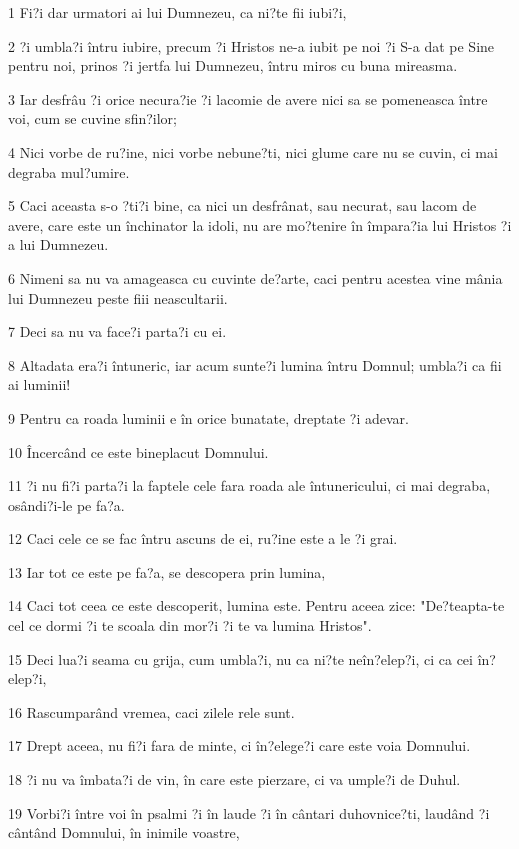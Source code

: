 \par 1 Fi?i dar urmatori ai lui Dumnezeu, ca ni?te fii iubi?i,
\par 2 ?i umbla?i întru iubire, precum ?i Hristos ne-a iubit pe noi ?i S-a dat pe Sine pentru noi, prinos ?i jertfa lui Dumnezeu, întru miros cu buna mireasma.
\par 3 Iar desfrâu ?i orice necura?ie ?i lacomie de avere nici sa se pomeneasca între voi, cum se cuvine sfin?ilor;
\par 4 Nici vorbe de ru?ine, nici vorbe nebune?ti, nici glume care nu se cuvin, ci mai degraba mul?umire.
\par 5 Caci aceasta s-o ?ti?i bine, ca nici un desfrânat, sau necurat, sau lacom de avere, care este un închinator la idoli, nu are mo?tenire în împara?ia lui Hristos ?i a lui Dumnezeu.
\par 6 Nimeni sa nu va amageasca cu cuvinte de?arte, caci pentru acestea vine mânia lui Dumnezeu peste fiii neascultarii.
\par 7 Deci sa nu va face?i parta?i cu ei.
\par 8 Altadata era?i întuneric, iar acum sunte?i lumina întru Domnul; umbla?i ca fii ai luminii!
\par 9 Pentru ca roada luminii e în orice bunatate, dreptate ?i adevar.
\par 10 Încercând ce este bineplacut Domnului.
\par 11 ?i nu fi?i parta?i la faptele cele fara roada ale întunericului, ci mai degraba, osândi?i-le pe fa?a.
\par 12 Caci cele ce se fac întru ascuns de ei, ru?ine este a le ?i grai.
\par 13 Iar tot ce este pe fa?a, se descopera prin lumina,
\par 14 Caci tot ceea ce este descoperit, lumina este. Pentru aceea zice: "De?teapta-te cel ce dormi ?i te scoala din mor?i ?i te va lumina Hristos".
\par 15 Deci lua?i seama cu grija, cum umbla?i, nu ca ni?te neîn?elep?i, ci ca cei în?elep?i,
\par 16 Rascumparând vremea, caci zilele rele sunt.
\par 17 Drept aceea, nu fi?i fara de minte, ci în?elege?i care este voia Domnului.
\par 18 ?i nu va îmbata?i de vin, în care este pierzare, ci va umple?i de Duhul.
\par 19 Vorbi?i între voi în psalmi ?i în laude ?i în cântari duhovnice?ti, laudând ?i cântând Domnului, în inimile voastre,
